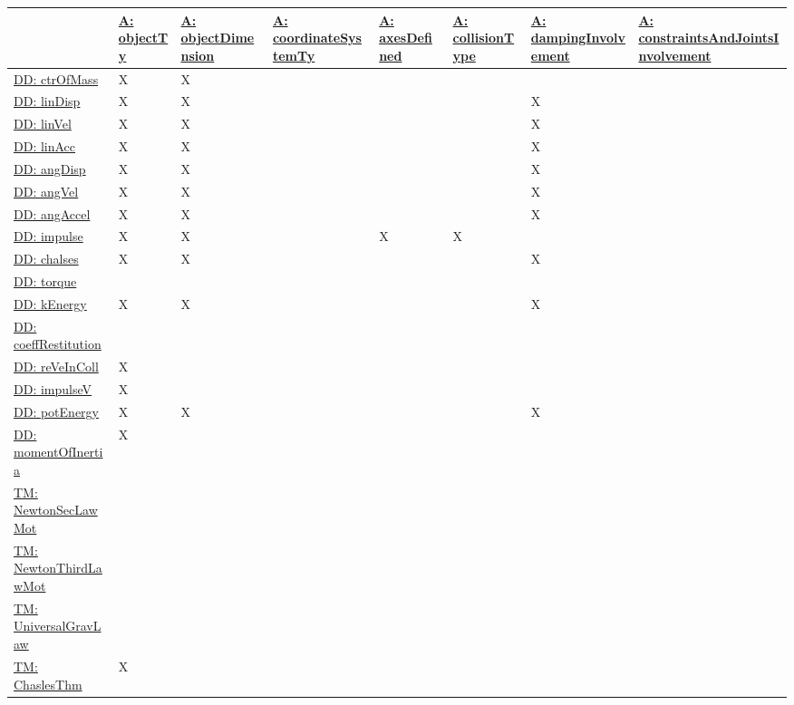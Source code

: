 \documentclass[12pt]{article}
\begin{document}
\begin{longtable}{l l l l l l l l}
\toprule
\textbf{} & \textbf{\hyperref[assumpOT]{A: objectTy}} & \textbf{\hyperref[assumpOD]{A: objectDimension}} & \textbf{\hyperref[assumpCST]{A: coordinateSystemTy}} & \textbf{\hyperref[assumpAD]{A: axesDefined}} & \textbf{\hyperref[assumpCT]{A: collisionType}} & \textbf{\hyperref[assumpDI]{A: dampingInvolvement}} & \textbf{\hyperref[assumpCAJI]{A: constraintsAndJointsInvolvement}}
\\
\midrule
\endhead
\hyperref[DD:ctrOfMass]{DD: ctrOfMass} & X & X &  &  &  &  & 
\\
\hyperref[DD:linDisp]{DD: linDisp} & X & X &  &  &  & X & 
\\
\hyperref[DD:linVel]{DD: linVel} & X & X &  &  &  & X & 
\\
\hyperref[DD:linAcc]{DD: linAcc} & X & X &  &  &  & X & 
\\
\hyperref[DD:angDisp]{DD: angDisp} & X & X &  &  &  & X & 
\\
\hyperref[DD:angVel]{DD: angVel} & X & X &  &  &  & X & 
\\
\hyperref[DD:angAccel]{DD: angAccel} & X & X &  &  &  & X & 
\\
\hyperref[DD:impulse]{DD: impulse} & X & X &  & X & X &  & 
\\
\hyperref[DD:chalses]{DD: chalses} & X & X &  &  &  & X & 
\\
\hyperref[DD:torque]{DD: torque} &  &  &  &  &  &  & 
\\
\hyperref[DD:kEnergy]{DD: kEnergy} & X & X &  &  &  & X & 
\\
\hyperref[DD:coeffRestitution]{DD: coeffRestitution} &  &  &  &  &  &  & 
\\
\hyperref[DD:reVeInColl]{DD: reVeInColl} & X &  &  &  &  &  & 
\\
\hyperref[DD:impulseV]{DD: impulseV} & X &  &  &  &  &  & 
\\
\hyperref[DD:potEnergy]{DD: potEnergy} & X & X &  &  &  & X & 
\\
\hyperref[DD:momentOfInertia]{DD: momentOfInertia} & X &  &  &  &  &  & 
\\
\hyperref[TM:NewtonSecLawMot]{TM: NewtonSecLawMot} &  &  &  &  &  &  & 
\\
\hyperref[TM:NewtonThirdLawMot]{TM: NewtonThirdLawMot} &  &  &  &  &  &  & 
\\
\hyperref[TM:UniversalGravLaw]{TM: UniversalGravLaw} &  &  &  &  &  &  & 
\\
\hyperref[TM:ChaslesThm]{TM: ChaslesThm} & X &  &  &  &  &  & 

\end{longtable}
\end{document}
